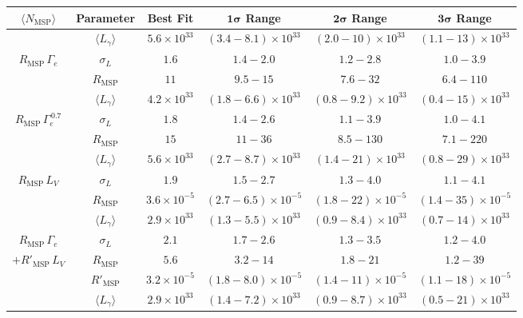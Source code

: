 \begin{table}[t]
\centering
\normalsize
\vspace{12pt}
{\renewcommand{\arraystretch}{1.2}
\begin{tabular}{|c|c|cccc|}
    \hline $\langle N_\textrm{MSP}\rangle$ & Parameter & Best Fit & $\bm{1 \sigma}$ Range & $\bm{2 \sigma}$ Range & $\bm{3 \sigma}$ Range\\
    \hline\hline
      & $\langle L_{\gamma} \rangle$ & $5.6 \times 10^{33}$& $(3.4 - 8.1) \times 10^{33}$& $(2.0 - 10) \times 10^{33}$& $(1.1 - 13) \times 10^{33}$\\
      $R_\textrm{MSP} \, \Gamma_e$ & $\sigma_L$ & $1.6$& $1.4 - 2.0$& $1.2 - 2.8$& $1.0 - 3.9$ \\
    & $R_\textrm{MSP}$ & $11$& $9.5 - 15$& $7.6 - 32$& $6.4 - 110$ \\
    \hline
         & $\langle L_{\gamma} \rangle$ & $4.2 \times 10^{33}$& $(1.8 - 6.6) \times 10^{33}$& $(0.8 - 9.2) \times 10^{33}$& $(0.4 - 15) \times 10^{33}$\\
     $R_\textrm{MSP} \, \Gamma_e^{\,0.7}$ & $\sigma_L$ & $1.8$& $1.4 - 2.6$& $1.1 - 3.9$& $1.0 - 4.1$ \\
    & $R_\textrm{MSP}$ & $15$& $11 - 36$& $8.5 - 130$& $7.1 - 220$ \\
    \hline
         & $\langle L_{\gamma} \rangle$ & $5.6 \times 10^{33}$& $(2.7-8.7) \times 10^{33}$& $(1.4 - 21) \times 10^{33}$& $(0.8 - 29) \times 10^{33}$\\
     $R_\textrm{MSP} \, L_V$ & $\sigma_L$ & $1.9$& $1.5 - 2.7$& $1.3 - 4.0$& $1.1 - 4.1$ \\
    & $R_\textrm{MSP}$ & $3.6\times 10^{-5}$& $(2.7-6.5)\times 10^{-5}$& $(1.8-22)\times 10^{-5}$& $(1.4-35)\times 10^{-5}$ \\
    \hline    
         & $\langle L_{\gamma} \rangle$ & $2.9 \times 10^{33}$& $(1.3 - 5.5) \times 10^{33}$& $(0.9 - 8.4) \times 10^{33}$& $(0.7 - 14) \times 10^{33}$\\
     $R_\textrm{MSP} \, \Gamma_e$ & $\sigma_L$ & $2.1$& $1.7 - 2.6$& $1.3 - 3.5$& $1.2 - 4.0$ \\
    $+R'_\textrm{MSP}\,L_V$& $R_\textrm{MSP}$ & $5.6$& $3.2 - 14$& $1.8 - 21$& $1.2 - 39$ \\
    & $R'_\textrm{MSP}$ & $3.2\times 10^{-5}$& $(1.8-8.0)\times 10^{-5}$& $(1.4-11)\times 10^{-5}$& $(1.1-18)\times 10^{-5}$ \\
    \hline   
         & $\langle L_{\gamma} \rangle$ & $2.9 \times 10^{33}$& $(1.4 - 7.2) \times 10^{33}$& $(0.9 - 8.7) \times 10^{33}$& $(0.5 - 21) \times 10^{33}$\\

\end{tabular}}
\end{table}
